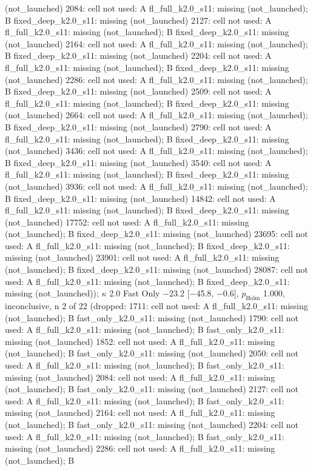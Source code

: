 (not\_launched) \textbar{} 2084: cell not used: A fl\_full\_k2.0\_s11: missing (not\_launched); B fixed\_deep\_k2.0\_s11: missing (not\_launched) \textbar{} 2127: cell not used: A fl\_full\_k2.0\_s11: missing (not\_launched); B fixed\_deep\_k2.0\_s11: missing (not\_launched) \textbar{} 2164: cell not used: A fl\_full\_k2.0\_s11: missing (not\_launched); B fixed\_deep\_k2.0\_s11: missing (not\_launched) \textbar{} 2204: cell not used: A fl\_full\_k2.0\_s11: missing (not\_launched); B fixed\_deep\_k2.0\_s11: missing (not\_launched) \textbar{} 2286: cell not used: A fl\_full\_k2.0\_s11: missing (not\_launched); B fixed\_deep\_k2.0\_s11: missing (not\_launched) \textbar{} 2509: cell not used: A fl\_full\_k2.0\_s11: missing (not\_launched); B fixed\_deep\_k2.0\_s11: missing (not\_launched) \textbar{} 2664: cell not used: A fl\_full\_k2.0\_s11: missing (not\_launched); B fixed\_deep\_k2.0\_s11: missing (not\_launched) \textbar{} 2790: cell not used: A fl\_full\_k2.0\_s11: missing (not\_launched); B fixed\_deep\_k2.0\_s11: missing (not\_launched) \textbar{} 3436: cell not used: A fl\_full\_k2.0\_s11: missing (not\_launched); B fixed\_deep\_k2.0\_s11: missing (not\_launched) \textbar{} 3540: cell not used: A fl\_full\_k2.0\_s11: missing (not\_launched); B fixed\_deep\_k2.0\_s11: missing (not\_launched) \textbar{} 3936: cell not used: A fl\_full\_k2.0\_s11: missing (not\_launched); B fixed\_deep\_k2.0\_s11: missing (not\_launched) \textbar{} 14842: cell not used: A fl\_full\_k2.0\_s11: missing (not\_launched); B fixed\_deep\_k2.0\_s11: missing (not\_launched) \textbar{} 17752: cell not used: A fl\_full\_k2.0\_s11: missing (not\_launched); B fixed\_deep\_k2.0\_s11: missing (not\_launched) \textbar{} 23695: cell not used: A fl\_full\_k2.0\_s11: missing (not\_launched); B fixed\_deep\_k2.0\_s11: missing (not\_launched) \textbar{} 23901: cell not used: A fl\_full\_k2.0\_s11: missing (not\_launched); B fixed\_deep\_k2.0\_s11: missing (not\_launched) \textbar{} 28087: cell not used: A fl\_full\_k2.0\_s11: missing (not\_launched); B fixed\_deep\_k2.0\_s11: missing (not\_launched)); $\kappa$ 2.0 Fast Only $-$23.2 [$-$45.8, $-$0.6], $p_\mathrm{Holm}$ 1.000, inconclusive, n 2 of 22 (dropped: 1711: cell not used: A fl\_full\_k2.0\_s11: missing (not\_launched); B fast\_only\_k2.0\_s11: missing (not\_launched) \textbar{} 1790: cell not used: A fl\_full\_k2.0\_s11: missing (not\_launched); B fast\_only\_k2.0\_s11: missing (not\_launched) \textbar{} 1852: cell not used: A fl\_full\_k2.0\_s11: missing (not\_launched); B fast\_only\_k2.0\_s11: missing (not\_launched) \textbar{} 2050: cell not used: A fl\_full\_k2.0\_s11: missing (not\_launched); B fast\_only\_k2.0\_s11: missing (not\_launched) \textbar{} 2084: cell not used: A fl\_full\_k2.0\_s11: missing (not\_launched); B fast\_only\_k2.0\_s11: missing (not\_launched) \textbar{} 2127: cell not used: A fl\_full\_k2.0\_s11: missing (not\_launched); B fast\_only\_k2.0\_s11: missing (not\_launched) \textbar{} 2164: cell not used: A fl\_full\_k2.0\_s11: missing (not\_launched); B fast\_only\_k2.0\_s11: missing (not\_launched) \textbar{} 2204: cell not used: A fl\_full\_k2.0\_s11: missing (not\_launched); B fast\_only\_k2.0\_s11: missing (not\_launched) \textbar{} 2286: cell not used: A fl\_full\_k2.0\_s11: missing (not\_launched); B 